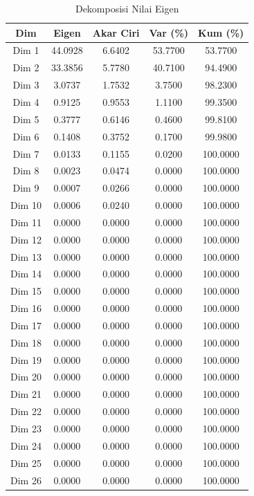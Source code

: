 \begin{table}[H]
\centering
\caption{Dekomposisi Nilai Eigen} \label{tab:eigen}
\begin{tabular}{|c|c|c|c|c|}
\hline
\textbf{Dim} & \textbf{Eigen} & \textbf{Akar Ciri} & \textbf{Var (\%)} & \textbf{Kum (\%)} \\
\hline
Dim 1 & 44.0928 & 6.6402 & 53.7700 & 53.7700 \\
Dim 2 & 33.3856 & 5.7780 & 40.7100 & 94.4900 \\
Dim 3 & 3.0737 & 1.7532 & 3.7500 & 98.2300 \\
Dim 4 & 0.9125 & 0.9553 & 1.1100 & 99.3500 \\
Dim 5 & 0.3777 & 0.6146 & 0.4600 & 99.8100 \\
Dim 6 & 0.1408 & 0.3752 & 0.1700 & 99.9800 \\
Dim 7 & 0.0133 & 0.1155 & 0.0200 & 100.0000 \\
Dim 8 & 0.0023 & 0.0474 & 0.0000 & 100.0000 \\
Dim 9 & 0.0007 & 0.0266 & 0.0000 & 100.0000 \\
Dim 10 & 0.0006 & 0.0240 & 0.0000 & 100.0000 \\
Dim 11 & 0.0000 & 0.0000 & 0.0000 & 100.0000 \\
Dim 12 & 0.0000 & 0.0000 & 0.0000 & 100.0000 \\
Dim 13 & 0.0000 & 0.0000 & 0.0000 & 100.0000 \\
Dim 14 & 0.0000 & 0.0000 & 0.0000 & 100.0000 \\
Dim 15 & 0.0000 & 0.0000 & 0.0000 & 100.0000 \\
Dim 16 & 0.0000 & 0.0000 & 0.0000 & 100.0000 \\
Dim 17 & 0.0000 & 0.0000 & 0.0000 & 100.0000 \\
Dim 18 & 0.0000 & 0.0000 & 0.0000 & 100.0000 \\
Dim 19 & 0.0000 & 0.0000 & 0.0000 & 100.0000 \\
Dim 20 & 0.0000 & 0.0000 & 0.0000 & 100.0000 \\
Dim 21 & 0.0000 & 0.0000 & 0.0000 & 100.0000 \\
Dim 22 & 0.0000 & 0.0000 & 0.0000 & 100.0000 \\
Dim 23 & 0.0000 & 0.0000 & 0.0000 & 100.0000 \\
Dim 24 & 0.0000 & 0.0000 & 0.0000 & 100.0000 \\
Dim 25 & 0.0000 & 0.0000 & 0.0000 & 100.0000 \\
Dim 26 & 0.0000 & 0.0000 & 0.0000 & 100.0000 \\

\end{tabular}
\end{table}
